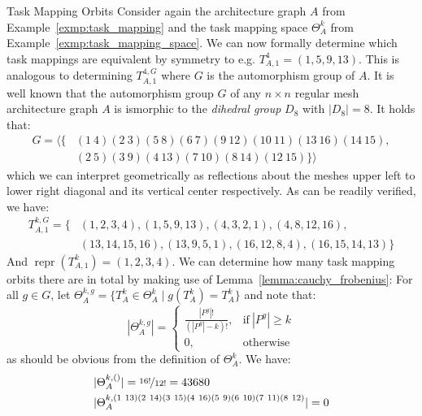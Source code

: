 \begin{exmp}{Task Mapping Orbits}
  Consider again the architecture graph $A$ from
  Example~\ref{exmp:task_mapping} and the task mapping space $\Theta_A^k$ from
  Example~\ref{exmp:task_mapping_space}.
  We can now formally determine which task mappings are equivalent by symmetry
  to e.g.  $T_{A,1}^4 = (1, 5, 9, 13)$. This is analogous to determining
  $T_{A,1}^{4,G}$ where $G$ is the automorphism group of $A$.
  It is well known that the automorphism group $G$ of any $n \times n$ regular
  mesh architecture graph $A$ is ismorphic to the \textit{dihedral group} $D_8$
  with $|D_8| = 8$. It holds that:
  \begin{align*}
    G = \langle\{&(1\ 4)(2\ 3)(5\ 8)(6\ 7)(9\ 12)(10\ 11)(13\ 16)(14\ 15), \\
                 &(2\ 5)(3\ 9)(4\ 13)(7\ 10)(8\ 14)(12\ 15)\}\rangle
  \end{align*}
  which we can interpret geometrically as reflections about the meshes upper
  left to lower right diagonal and its vertical center respectively. As can be
  readily verified, we have:
  \begin{align*}
    T_{A,1}^{k,G} = \{
      &(1, 2, 3, 4),
      (1, 5, 9, 13),
      (4, 3, 2, 1),
      (4, 8, 12, 16),\\
      &(13, 14, 15, 16),
      (13, 9, 5, 1),
      (16, 12, 8, 4),
      (16, 15, 14, 13)
    \}
  \end{align*}
  And $\operatorname{repr}(T_{A,1}^k) = (1, 2, 3, 4)$.
  We can determine how many task mapping orbits there are in total by making use of
  Lemma~\ref{lemma:cauchy_frobenius}: For all $g \in G$, let $\Theta_A^{k, g} =
  \{T_A^k \in \Theta_A^k \mid g(T_A^k) = T_A^k\}$ and note that:
  \begin{equation*}
    |\Theta_A^{k,g}| = \begin{cases}
                         \frac{|P^g|!}{(|P^g| - k)!}, &\text{if}\ |P^g| \geq k\\
                         0,                           &\text{otherwise}
                       \end{cases}
  \end{equation*}
  as should be obvious from the definition of $\Theta_A^k$. We have:
  \begin{equation*}
    \begin{split}
      &|\Theta_A^{k,()}| = \nicefrac{16!}{12!} = 43680 \\
      &|\Theta_A^{k,(1\ 13)(2\ 14)(3\ 15)(4\ 16)(5\ 9)(6\ 10)(7\ 11)(8\ 12)}| = 0 \\

\end{split}
\end{equation*}
\end{exmp}
